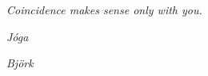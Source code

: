 








\small

\hfill \emph{Coincidence makes sense only with you.}

\hfill

\hfill \emph{Jóga}

\hfill \emph{Björk}





